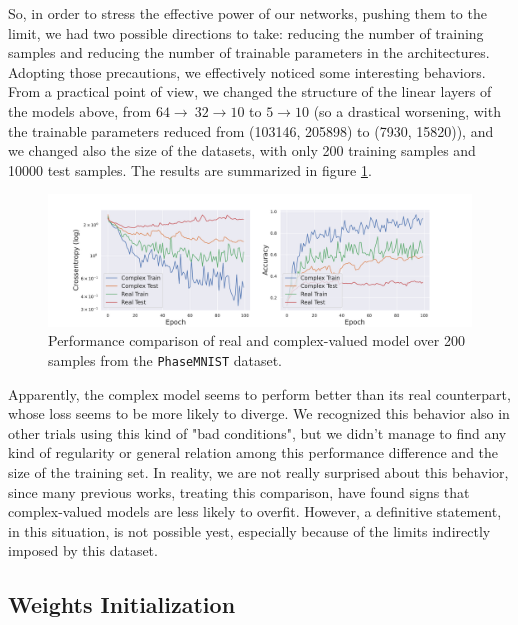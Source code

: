 \documentclass[../main.tex]{subfiles}
\begin{document}
So, in order to stress the effective power of our networks, pushing them to the limit, we had two possible directions to take: reducing the number of training samples and reducing the number of trainable parameters in the architectures. Adopting those precautions, we effectively noticed some interesting behaviors. From a practical point of view, we changed the structure of the linear layers of the models above, from $64\to\ 32\to 10$ to $5\to 10$ (so a drastical worsening, with the trainable parameters reduced from (103146, 205898) to (7930, 15820)), and we changed also the size of the datasets, with only 200 training samples and 10000 test samples. The results are summarized in figure \ref{fig:phasemnist_200}.
\begin{figure}[!ht]
	\centering
	\includegraphics[width=\textwidth]{pictures/phasemnist_200}
	\caption{Performance comparison of real and complex-valued model over 200 samples from the \texttt{PhaseMNIST} dataset.}
	\label{fig:phasemnist_200}
\end{figure}
Apparently, the complex model seems to perform better than its real counterpart, whose loss seems to be more likely to diverge. We recognized this behavior also in other trials using this kind of "bad conditions", but we didn't manage to find any kind of regularity or general relation among this performance difference and the size of the training set. In reality, we are not really surprised about this behavior, since many previous works, treating this comparison, have found signs that complex-valued models are less likely to overfit. However, a definitive statement, in this situation, is not possible yest, especially because of the limits indirectly imposed by this dataset.


\subsection*{Weights Initialization}
\end{document}
